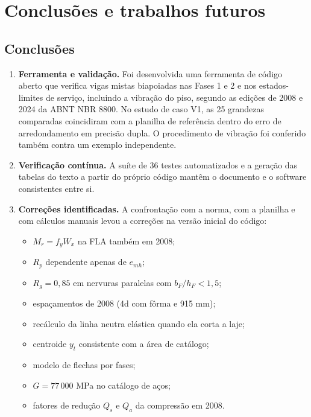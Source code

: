 \chapter{Conclusões e trabalhos futuros}\label{cap:5}

\section{Conclusões}\label{sec:5.1}
\begin{enumerate}
\item \textbf{Ferramenta e validação.} Foi desenvolvida uma ferramenta de código aberto que verifica vigas mistas biapoiadas nas Fases 1 e 2 e nos estados-limites de serviço, incluindo a vibração do piso, segundo as edições de 2008 e 2024 da ABNT NBR 8800. No estudo de caso V1, as 25 grandezas comparadas coincidiram com a planilha de referência dentro do erro de arredondamento em precisão dupla. O procedimento de vibração foi conferido também contra um exemplo independente.
\item \textbf{Verificação contínua.} A suíte de 36 testes automatizados e a geração das tabelas do texto a partir do próprio código mantêm o documento e o software consistentes entre si.
\item \textbf{Correções identificadas.} A confrontação com a norma, com a planilha e com cálculos manuais levou a correções na versão inicial do código:
\begin{itemize}
\item $M_r = f_y W_x$ na FLA também em 2008;
\item $R_p$ dependente apenas de $e_{mh}$;
\item $R_g = 0{,}85$ em nervuras paralelas com $b_F/h_F < 1{,}5$;
\item espaçamentos de 2008 (4d com fôrma e 915 mm);
\item recálculo da linha neutra elástica quando ela corta a laje;
\item centroide $y_t$ consistente com a área de catálogo;
\item modelo de flechas por fases;
\item $G = 77\,000$ MPa no catálogo de aços;
\item fatores de redução $Q_s$ e $Q_a$ da compressão em 2008.
\end{itemize}


\end{enumerate}
